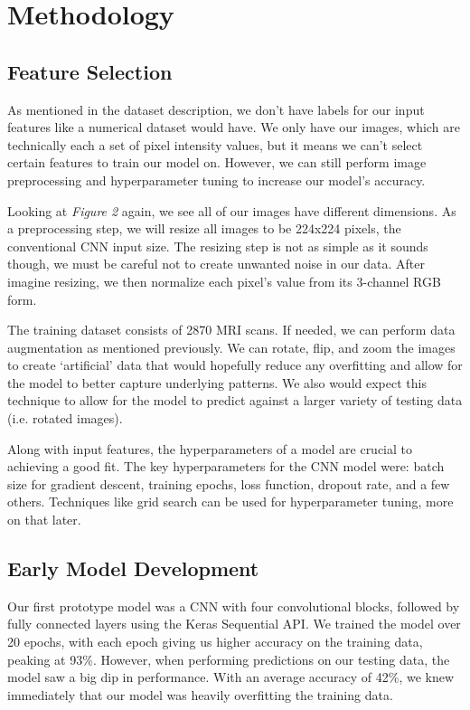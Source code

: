 \documentclass[conference]{IEEEtran}
\begin{document}
\section{\large Methodology}

\subsection{\large Feature Selection}

As mentioned in the dataset description, we don't have labels for our input features like a numerical dataset would have. We only have our images, which are technically each a set of pixel intensity values, but it means we can't select certain features to train our model on. However, we can still perform image preprocessing and hyperparameter tuning to increase our model's accuracy.

Looking at \textit{Figure 2} again, we see all of our images have different dimensions. As a preprocessing step, we will resize all images to be 224x224 pixels, the conventional CNN input size. The resizing step is not as simple as it sounds though, we must be careful not to create unwanted noise in our data. After imagine resizing, we then normalize each pixel's value from its 3-channel RGB form.

The training dataset consists of 2870 MRI scans. If needed, we can perform data augmentation as mentioned previously. We can rotate, flip, and zoom the images to create `artificial' data that would hopefully reduce any overfitting and allow for the model to better capture underlying patterns. We also would expect this technique to allow for the model to predict against a larger variety of testing data (i.e. rotated images). 

Along with input features, the hyperparameters of a model are crucial to achieving a good fit. The key hyperparameters for the CNN model were: batch size for gradient descent, training epochs, loss function, dropout rate, and a few others. Techniques like grid search can be used for hyperparameter tuning, more on that later.

\subsection{\large Early Model Development}

Our first prototype model was a CNN with four convolutional blocks, followed by fully connected layers using the Keras Sequential API. We trained the model over 20 epochs, with each epoch giving us higher accuracy on the training data, peaking at 93\%. However, when performing predictions on our testing data, the model saw a big dip in performance. With an average accuracy of 42\%, we knew immediately that our model was heavily overfitting the training data.
\end{document}
